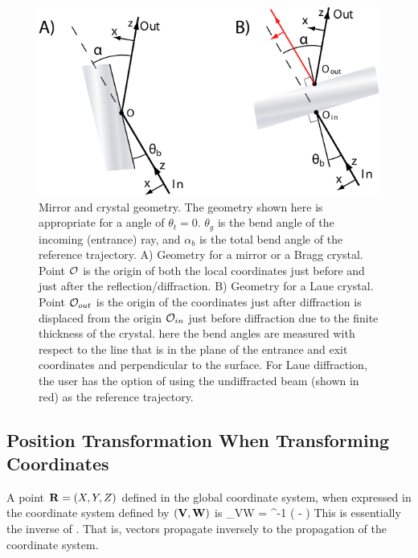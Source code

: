 \begin{figure}
  \centering \includegraphics{mirror.pdf} 
\caption[Mirror and crystal geometry] {Mirror and crystal geometry.
The geometry shown here is appropriate for a  angle of
$\theta_t = 0$.  $\theta_g$ is the bend angle of the incoming
(entrance) ray, and $\alpha_b$ is the total bend
angle of the reference trajectory. A) Geometry for a mirror or a Bragg
crystal. Point ${\cal O}$ is the origin of both the local coordinates
just before and just after the reflection/diffraction. B) Geometry for
a Laue crystal.  Point ${\cal O}_{out}$ is the origin of the coordinates
just after diffraction is displaced from the origin ${\cal O}_{in}$ just
before diffraction due to the finite thickness of the crystal. here
the bend angles are measured with respect to the line that is in
the plane of the entrance and exit coordinates and perpendicular to
the surface. For Laue diffraction, the user has the option of using
the undiffracted beam (shown in red) as the reference trajectory.
  }  
  \label{f:mirror}
\end{figure}

\subsection{Position Transformation When Transforming Coordinates}
\label{s:pos.trans}

A point ${\bf R} = (X, Y, Z)$ defined in the global coordinate system,
when expressed in the coordinate system defined by $({\bf V}, {\bf W})$ is
\Begineq
  \bfR_{VW} = \bfW^{-1} \left( \bfR - \bfV \right)
  \label{rwrv}
\Endeq
This is essentially the inverse of . That is, vectors
propagate inversely to the propagation of the coordinate system.

